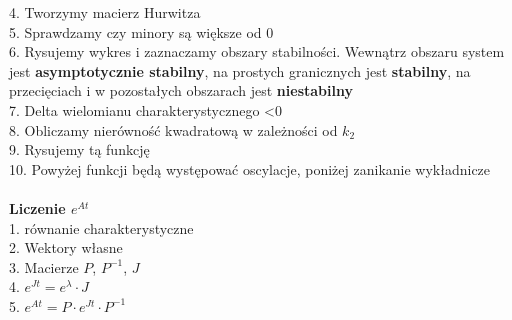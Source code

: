 4. Tworzymy macierz Hurwitza\\
5. Sprawdzamy czy minory są większe od 0\\
6. Rysujemy wykres i zaznaczamy obszary stabilności. Wewnątrz obszaru system jest \textbf{asymptotycznie stabilny}, na prostych granicznych jest \textbf{stabilny}, na przecięciach i w pozostałych obszarach jest \textbf{niestabilny}\\
7. Delta wielomianu charakterystycznego <0\\
8. Obliczamy nierówność kwadratową w zależności od $k_2$\\
9. Rysujemy tą funkcję\\
10. Powyżej funkcji będą występować oscylacje, poniżej zanikanie wykładnicze\\
\\
\textbf{Liczenie $e^{At}$}\\
1. równanie charakterystyczne\\
2. Wektory własne\\
3. Macierze $P$, $P^{-1}$, $J$\\
4. $e^{Jt}=e^\lambda \cdot J$\\
5. $e^{At}=P\cdot e^{Jt}\cdot P^{-1}$\\

\pagebreak
